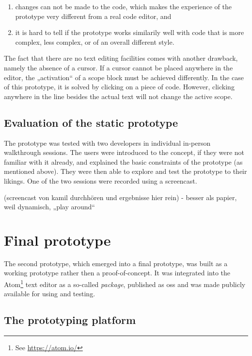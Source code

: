 \begin{enumerate}
\def\labelenumi{\arabic{enumi}.}
\itemsep1pt\parskip0pt
\item
  changes can not be made to the code, which makes the experience of the
  prototype very different from a real code editor, and
\item
  it is hard to tell if the prototype works similarily well with code
  that is more complex, less complex, or of an overall different style.
\end{enumerate}

The fact that there are no text editing facilities comes with another
drawback, namely the absence of a cursor. If a cursor cannot be placed
anywhere in the editor, the „activation“ of a scope block must be
achieved differently. In the case of this prototype, it is solved by
clicking on a piece of code. However, clicking anywhere in the line
besides the actual text will not change the active scope.

\subsection{Evaluation of the static
prototype}\label{evaluation-of-the-static-prototype}

The prototype was tested with two developers in individual in-person
walkthrough sessions. The users were introduced to the concept, if they
were not familiar with it already, and explained the basic constraints
of the prototype (as mentioned above). They were then able to explore
and test the prototype to their likings. One of the two sessions were
recorded using a screencast.

(screencast von kamil durchhören und ergebnisse hier rein) - besser als
papier, weil dynamisch, „play around“

\section{Final prototype}\label{final-prototype}

The second prototype, which emerged into a final prototype, was built as
a working prototype rather then a proof-of-concept. It was integrated
into the Atom\footnote{See \url{https://atom.io/}} text editor as a
so-called \emph{package}, published as \gls{oss} and was made publicly
available for using and testing.

\subsection{The prototyping platform}\label{the-prototyping-platform}

